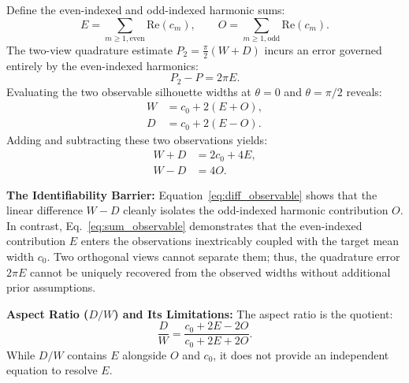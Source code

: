 \documentclass[journal]{IEEEtran}
\begin{document}
Define the even-indexed and odd-indexed harmonic sums:
\begin{equation}
E = \sum_{m \ge 1, \text{even}} \text{Re}(c_m), \qquad O = \sum_{m \ge 1, \text{odd}} \text{Re}(c_m).
\label{eq:harmonic_sums}
\end{equation}
The two-view quadrature estimate $P_2 = \frac{\pi}{2}(W + D)$ incurs an error governed entirely by the even-indexed harmonics:
\begin{equation}
P_2 - P = 2\pi E.
\label{eq:two_view_error_fourier}
\end{equation}
Evaluating the two observable silhouette widths at $\theta = 0$ and $\theta = \pi/2$ reveals:
\begin{align}
W &= c_0 + 2(E + O), \label{eq:w_obs} \\
D &= c_0 + 2(E - O). \label{eq:d_obs}
\end{align}
Adding and subtracting these two observations yields:
\begin{align}
W + D &= 2c_0 + 4E, \label{eq:sum_observable} \\
W - D &= 4O. \label{eq:diff_observable}
\end{align}

\noindent \textbf{The Identifiability Barrier:} Equation~\eqref{eq:diff_observable} shows that the linear difference $W - D$ cleanly isolates the odd-indexed harmonic contribution $O$. In contrast, Eq.~\eqref{eq:sum_observable} demonstrates that the even-indexed contribution $E$ enters the observations inextricably coupled with the target mean width $c_0$. Two orthogonal views cannot separate them; thus, the quadrature error $2\pi E$ cannot be uniquely recovered from the observed widths without additional prior assumptions.

\noindent \textbf{Aspect Ratio ($D/W$) and Its Limitations:} The aspect ratio is the quotient:
\begin{equation}
\frac{D}{W} = \frac{c_0 + 2E - 2O}{c_0 + 2E + 2O}.
\label{eq:dw_ratio}
\end{equation}
While $D/W$ contains $E$ alongside $O$ and $c_0$, it does not provide an independent equation to resolve $E$. 
\end{document}
